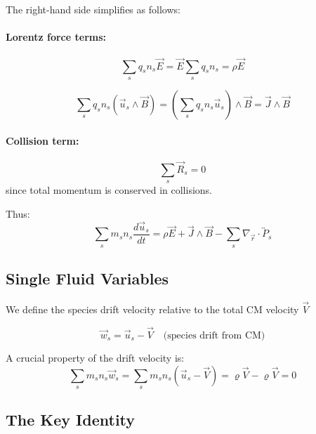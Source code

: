 The right-hand side simplifies as follows:

\paragraph{Lorentz force terms:}
\begin{equation*}
\sum_s q_s n_s \vec{E} = \vec{E} \sum_s q_s n_s = \rho \vec{E}
\end{equation*}

\begin{equation*}
\sum_s q_s n_s (\vec{u}_s \wedge \vec{B}) = \left(\sum_s q_s n_s \vec{u}_s\right) \wedge \vec{B} = \vec{J} \wedge \vec{B}
\end{equation*}

\paragraph{Collision term:}
\begin{equation*}
\sum_s \vec{R}_s = 0
\end{equation*}
since total momentum is conserved in collisions.

Thus:
\begin{equation*}
\sum_s m_s n_s \frac{d\vec{u}_s}{dt} = \rho \vec{E} + \vec{J} \wedge \vec{B} - \sum_s \nabla_{\vec{r}} \cdot \overleftrightarrow{P}_s
\label{eq:summed_momentum}
\end{equation*}

\subsection{Single Fluid Variables}

We define the species drift velocity relative to the total CM velocity $\vec{V}$

\begin{equation*}
\vec{w}_s = \vec{u}_s - \vec{V} \quad \text{(species drift from CM)}
\end{equation*}

A crucial property of the drift velocity is:
\begin{equation}
\sum_s m_s n_s \vec{w}_s = \sum_s m_s n_s (\vec{u}_s - \vec{V}) = \varrho \vec{V} - \varrho \vec{V} = 0
\label{eq:drift_sum_zero}
\end{equation}

\subsection{The Key Identity}

